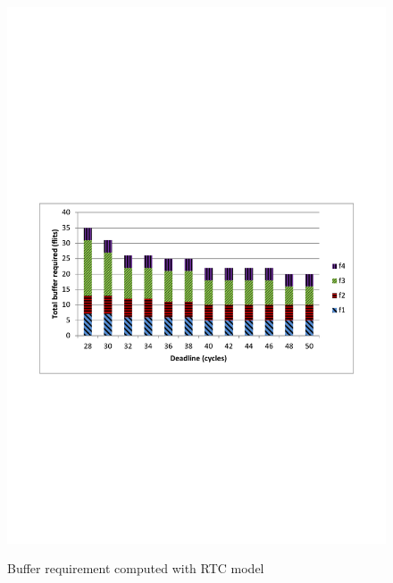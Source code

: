 \documentclass[10pt,journal]{IEEEtran}
\begin{document}
\begin{figure}
  \centering
  \includegraphics[scale=0.5]{figures/bufopt.pdf}\\
  \caption{Buffer requirement computed with RTC model}\label{LLBAvsRTC}
\end{figure}
\end{document}
